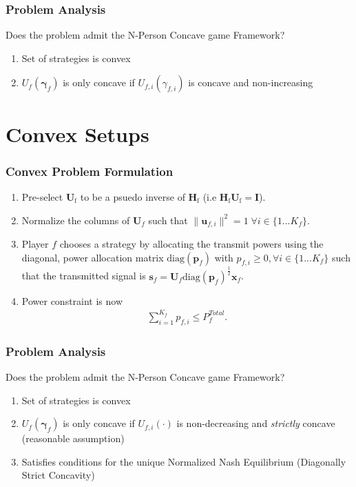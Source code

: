 \documentclass[10pt,tgadventor, onlymath]{beamer}
\begin{document}
\begin{frame}
\frametitle{Problem Analysis}
Does the problem admit the N-Person Concave game Framework? 
\\
\begin{enumerate}
\item  Set of strategies is convex \faThumbsOUp
\item  $U_{f}(\boldsymbol{\gamma}_{f})$ is only concave if $U_{f,i}(\gamma_{f,i})$ is concave and non-increasing 
\faThumbsODown
\end{enumerate}

\end{frame}

\section{Convex Setups}

\begin{frame}
\frametitle{Convex Problem Formulation}
\begin{enumerate}
\item Pre-select $\mathbf{U}_\mathrm{f}$ to be a psuedo inverse of $\mathbf{H}_\mathrm{f}$  (i.e $\mathbf{H}_\mathrm{f}\mathbf{U}_\mathrm{f} = \mathbf{I}$).
\item 
	Normalize the columns of $\mathbf{U}_{f}$ such that 
	 $\|\mathbf{u}_{f,i}\|^2 =1 \;\forall i \in \{1 ... K_{f}\}$.
\item 
	Player $f$ chooses a strategy by allocating the transmit powers using the diagonal, power allocation  	
	matrix $\mathrm{diag}(\mathbf{p}_{f})$ with $p_{f,i} \geq 0, \forall i \in \{1 ... K_{f}\}$
such that the transmitted 		
	signal is 
	$\mathbf{s}_{f	}= \mathbf{U}_{f} 
	\mathrm{diag}(\mathbf{p}_{f})^{\frac{1}{2}}
	\mathbf{x}_{f}$.
\item 
	Power constraint is now 
	\begin{gather*}
	\sum_{i=1}^{K_{f}} p_{f,i}
	  \leq P^{Total}_{f}.
	  	\end{gather*}
\end{enumerate}
\end{frame}

\begin{frame}
\frametitle{Problem Analysis}
Does the problem admit the N-Person Concave game Framework? 
\\
\begin{enumerate}
\item  Set of strategies is convex \faThumbsOUp
\item  $U_{f}(\boldsymbol{\gamma}_{f})$ is only concave if 
	$U_{f,i}(\cdot)$ is non-decreasing and \emph{strictly} concave (reasonable assumption) \faThumbsOUp
\item 
	Satisfies conditions for the unique Normalized Nash Equilibrium (Diagonally Strict Concavity)  \faThumbsOUp  \faThumbsOU
\end{enumerate}

\end{frame}
\end{document}
